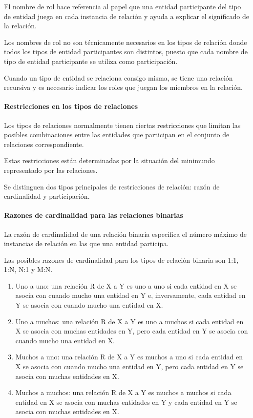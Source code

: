 El nombre de rol hace referencia al papel que una entidad participante del tipo de entidad juega en cada instancia de relación y ayuda a explicar el significado de la relación.


Los nombres de rol no son técnicamente necesarios en los tipos de relación donde todos los tipos de entidad participantes son distintos, puesto que cada nombre de tipo de entidad participante se utiliza como participación.

Cuando un tipo de entidad se relaciona consigo misma, se tiene una relación recursiva y es necesario indicar los roles que juegan los miembros en la relación.


\paragraph*{Restricciones en los tipos de relaciones}


Los tipos de relaciones normalmente tienen ciertas restricciones que limitan las posibles combinaciones entre las entidades que participan en el conjunto de relaciones correspondiente.


Estas restricciones están determinadas por la situación del minimundo representado por las relaciones. 


Se distinguen dos tipos principales de restricciones de relación: razón de cardinalidad y participación.


\paragraph*{Razones de cardinalidad para las relaciones binarias}
La razón de cardinalidad de una relación binaria especifica el número máximo de instancias de relación en las que una entidad participa.


Las posibles razones de cardinalidad para los tipos de relación binaria son 1:1, 1:N, N:1 y M:N.
\begin{enumerate}
    \item Uno a uno: una relación R de X a Y es uno a uno si cada entidad en X se asocia con cuando mucho una entidad en Y e, inversamente, cada entidad en Y se asocia con cuando mucho una entidad en X.
    \item Uno a muchos: una relación R de X a Y es uno a muchos si cada entidad en X se asocia con muchas entidades en Y, pero cada entidad en Y se asocia con cuando mucho una entidad en X. 
    \item Muchos a uno: una relación R de X a Y es muchos a uno si cada entidad en X se asocia con cuando mucho una entidad en Y, pero cada entidad en Y se asocia con muchas entidades en X. 
    \item Muchos a muchos: una relación R de X a Y es muchos a muchos si cada entidad en X se asocia con muchas entidades en Y y cada entidad en Y se asocia con muchas entidades en X. 
\end{enumerate}


